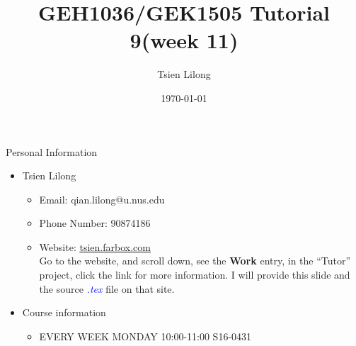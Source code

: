\documentclass[11pt]{beamer}
\begin{document}
\title{GEH1036/GEK1505 Tutorial 9(week 11) }
\date{\today}
\author{Tsien Lilong}
\maketitle
{}
\begin{frame}{Personal Information}
  \begin{itemize}
    \item Tsien Lilong
          \begin{itemize}
            \item Email: qian.lilong@u.nus.edu
            \item Phone Number: 90874186
            \item Website: \underline{\url{tsien.farbox.com}}\\
                  Go to the website, and scroll down, see the \textbf{Work} entry, in the ``Tutor'' project, click the link
                  for more information. I will provide this slide and the source \textcolor{blue}{\it.tex} file on that site.
          \end{itemize}
    \item Course information
          \begin{itemize}
            \item EVERY WEEK	MONDAY	10:00-11:00	S16-0431
          \end{itemize}

          
  \end{itemize}
\end{frame}
\end{document}
